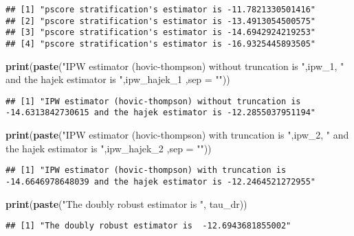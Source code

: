 \documentclass[]{article}
\newenvironment{Shaded}{\begin{snugshade}}{\end{snugshade}}
\newcommand{\KeywordTok}[1]{\textcolor[rgb]{0.13,0.29,0.53}{\textbf{#1}}}
\newcommand{\DataTypeTok}[1]{\textcolor[rgb]{0.13,0.29,0.53}{#1}}
\newcommand{\DecValTok}[1]{\textcolor[rgb]{0.00,0.00,0.81}{#1}}
\newcommand{\StringTok}[1]{\textcolor[rgb]{0.31,0.60,0.02}{#1}}
\newcommand{\NormalTok}[1]{#1}
\begin{document}
\begin{verbatim}
## [1] "pscore stratification's estimator is -11.7821330501416"
## [2] "pscore stratification's estimator is -13.4913054500575"
## [3] "pscore stratification's estimator is -14.6942924219253"
## [4] "pscore stratification's estimator is -16.9325445893505"
\end{verbatim}

\begin{Shaded}
\begin{Highlighting}[]
\KeywordTok{print}\NormalTok{(}\KeywordTok{paste}\NormalTok{(}\StringTok{"IPW estimator (hovic-thompson) without truncation is "}\NormalTok{,ipw_}\DecValTok{1}\NormalTok{, }\StringTok{" and the hajek estimator is "}\NormalTok{,ipw_hajek_}\DecValTok{1}\NormalTok{ ,}\DataTypeTok{sep =} \StringTok{""}\NormalTok{))}
\end{Highlighting}
\end{Shaded}

\begin{verbatim}
## [1] "IPW estimator (hovic-thompson) without truncation is -14.6313842730615 and the hajek estimator is -12.2855037951194"
\end{verbatim}

\begin{Shaded}
\begin{Highlighting}[]
\KeywordTok{print}\NormalTok{(}\KeywordTok{paste}\NormalTok{(}\StringTok{"IPW estimator (hovic-thompson) with truncation is "}\NormalTok{,ipw_}\DecValTok{2}\NormalTok{, }\StringTok{" and the hajek estimator is "}\NormalTok{,ipw_hajek_}\DecValTok{2}\NormalTok{ ,}\DataTypeTok{sep =} \StringTok{""}\NormalTok{))}
\end{Highlighting}
\end{Shaded}

\begin{verbatim}
## [1] "IPW estimator (hovic-thompson) with truncation is -14.6646978648039 and the hajek estimator is -12.2464521272955"
\end{verbatim}

\begin{Shaded}
\begin{Highlighting}[]
\KeywordTok{print}\NormalTok{(}\KeywordTok{paste}\NormalTok{(}\StringTok{"The doubly robust estimator is "}\NormalTok{, tau_dr))}
\end{Highlighting}
\end{Shaded}

\begin{verbatim}
## [1] "The doubly robust estimator is  -12.6943681855002"
\end{verbatim}
\end{document}
